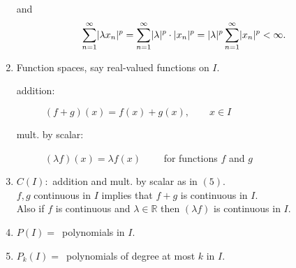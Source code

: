 \begin{beispiele}
\begin{enumerate}[1)]
		and \[
			\sum_{n=1}^{\infty} \lvert\lambda x_n\rvert^p = \sum_{n=1}^{\infty} \lvert\lambda\rvert^p \cdot \lvert x_n\rvert^p = \lvert\lambda\rvert^p \sum_{n=1}^{\infty}\lvert x_n\rvert^p < \infty.
		\]
		\item Function spaces, say real-valued functions on $I$.
		\begin{description}
			\item[addition:] $(f+g)(x) = f(x)+ g(x), \qquad x \in I$
			\item[mult. by scalar:] $(\lambda f)(x)= \lambda f(x) \qquad $ for functions $f$ and $g$ 
		\end{description}
		\item $C(I):$ addition and mult. by scalar as in $(5)$. \\ $f,g$ continuous in $I$ implies that $f+g$ is continuous in $I$. \\
		Also if $f$ is continuous and $\lambda \in \mathbb{R}$ then $(\lambda f)$ is continuous in $I$.
		\item $P(I)= \,$ polynomials in $I$.
		\item $P_k(I)= \,$ polynomials of degree at most $k$ in $I$.
	\end{enumerate}
\end{beispiele}
